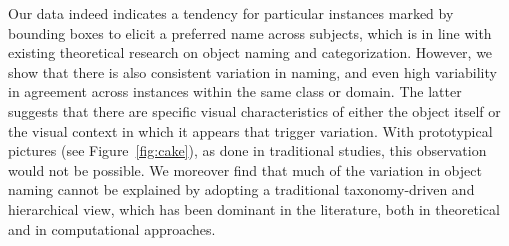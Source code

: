 Our data indeed indicates a tendency for particular instances marked by bounding boxes to elicit a preferred name across subjects, which is in line with existing theoretical research on object naming and categorization. 
However, we show that there is also consistent variation in naming, and even high variability in agreement across instances within the same class or domain.
The latter suggests that there are specific visual characteristics of either the object itself or the visual context in which it appears that trigger variation. With prototypical pictures (see Figure\ \ref{fig:cake}), as done in traditional studies, this observation would not be possible.
We moreover find that much of the variation in object naming cannot be explained by adopting a traditional taxonomy-driven and hierarchical view, which has been dominant in the literature, both in theoretical and in computational approaches.


